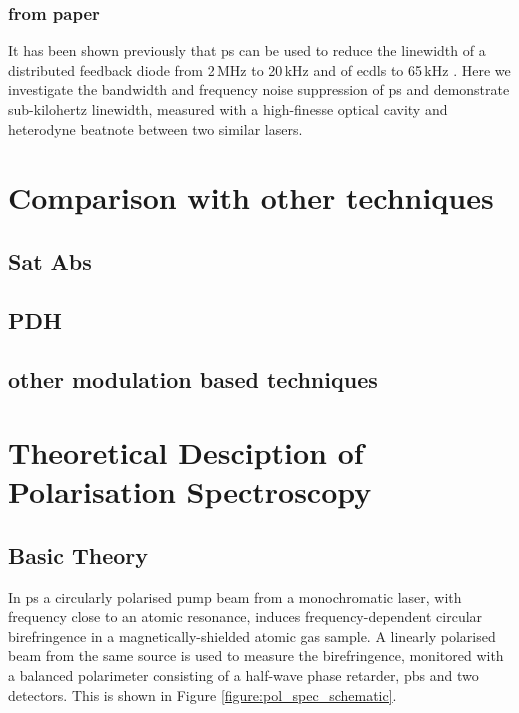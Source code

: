 \subsubsection{from paper}
It has been shown previously that \gls*{ps} can be used to reduce the linewidth of a distributed feedback diode from 2\,MHz to 20\,kHz \cite{torii_laser-phase_2012} and of \glspl*{ecdl} to 65\,kHz \cite{yoshikawa_frequency_2003}.
Here we investigate the bandwidth and frequency noise suppression of \gls*{ps} and demonstrate sub-kilohertz linewidth, measured with a high-finesse optical cavity and heterodyne beatnote between two similar lasers.

\section{Comparison with other techniques}
\subsection{Sat Abs}
\subsection{PDH}
\subsection{other modulation based techniques}
\section{Theoretical Desciption of Polarisation Spectroscopy}\label{section:pol_spec_theory}
\subsection{Basic Theory}

In \gls{ps} a circularly polarised pump beam from a monochromatic laser, with frequency close to an atomic resonance, induces frequency-dependent circular birefringence in a magnetically-shielded atomic gas sample.
A linearly polarised beam from the same source is used to measure the birefringence, monitored with a balanced polarimeter consisting of a half-wave phase retarder, \gls{pbs} and two detectors. This is shown in Figure \ref{figure:pol_spec_schematic}.

